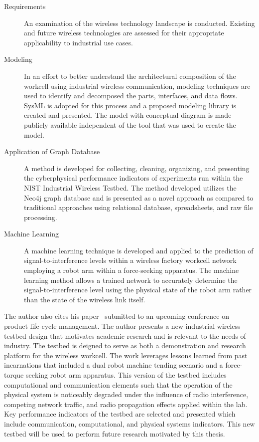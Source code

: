 \documentclass[twocolumn]{IEEEtran}
\begin{document}
		\begin{description}
			
			\item[Requirements] \cite{CandellRW2017} \cite{Montgomery2019} \cite{Candell2018.IWSGuide} \cite{ieeeMagazine2018} An examination of the wireless technology landscape is conducted.  Existing and future wireless technologies are assessed for their appropriate applicability to industrial use cases.
			
			\item[Modeling] \cite{Candell2019ASR.SYSML} \cite{Candell2018SysML.JRES} In an effort to better understand the architectural composition of the workcell using industrial wireless communication, modeling techniques are used to identify and decomposed the parts, interfaces, and data flows.  SysML is adopted for this process and a proposed modeling library is created and presented.  The model with conceptual diagram is made publicly available independent of the tool that was used to create the model.
			
			\item[Application of Graph Database] \cite{CandellISIT2020.Conf} A method is developed for collecting, cleaning, organizing, and presenting the cyberphysical performance indicators of experiments run within the NIST Industrial Wireless Testbed. The method developed utilizes the Neo4j graph database and is presented as a novel approach as compared to traditional approaches using relational database, spreadsheets, and raw file processing.
			
			\item[Machine Learning] \cite{CandellISIE2019.Conf} \cite{CandellIJAMT2020.Jrnl} A machine learning technique is developed and applied to the prediction of signal-to-interference levels within a wireless factory workcell network employing a robot arm within a force-seeking apparatus.  The machine learning method allows a trained network to accurately determine the signal-to-interference level using the physical state of the robot arm rather than the state of the wireless link itself.
			
		\end{description}
	
		The author also cites his paper~\cite{Candell.PLMConf2020} submitted to an upcoming conference on product life-cycle management.  The author presents a new industrial wireless testbed design that motivates academic research and is relevant to the needs of industry. The testbed is deigned to serve as both a demonstration and research platform for the wireless workcell. The work leverages lessons learned from past incarnations that included a dual robot machine tending scenario and a force-torque seeking robot arm apparatus. This version of the testbed includes computational and communication elements such that the operation of the physical system is noticeably degraded under the influence of radio interference, competing network traffic, and radio propagation effects applied within the lab. Key performance indicators of the testbed are selected and presented which include communication, computational, and physical systems indicators. This new testbed will be used to perform future research motivated by this thesis.
		
\end{document}
